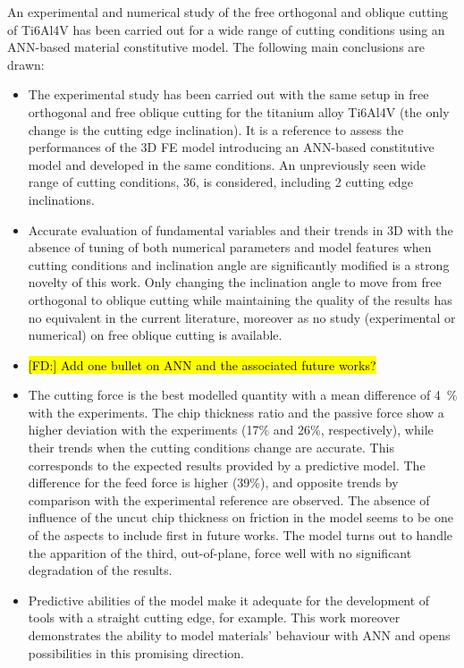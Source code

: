 \documentclass[preprint,12pt,times]{elsarticle}
\DeclareRobustCommand{\FD}[1]{ {\begingroup\sethlcolor{VWgreen}\textcolor{black}{\hl{[FD:] #1}}\endgroup} }
\begin{document}
An experimental and numerical study of the free orthogonal and oblique cutting of Ti6Al4V has been carried out for a wide range of cutting conditions using an ANN-based material constitutive model. The following main conclusions are drawn:
\begin{itemize}
  \item The experimental study has been carried out with the same setup in free orthogonal and free oblique cutting for the titanium alloy Ti6Al4V (the only change is the cutting edge inclination). It is a reference to assess the performances of the 3D FE model introducing an ANN-based constitutive model and developed in the same conditions. An unpreviously seen wide range of cutting conditions, 36, is considered, including 2 cutting edge inclinations.
  \item Accurate evaluation of fundamental variables and their trends in 3D with the absence of tuning of both numerical parameters and model features when cutting conditions and inclination angle are significantly modified is a strong novelty of this work. Only changing the inclination angle to move from free orthogonal to oblique cutting while maintaining the quality of the results has no equivalent in the current literature, moreover as no study (experimental or numerical) on free oblique cutting is available.
  \item \FD{Add one bullet on ANN and the associated future works?}
  \item The cutting force is the best modelled quantity with a mean difference of \qty{4}{\%} with the experiments. The chip thickness ratio and the passive force show a higher deviation with the experiments (17\% and 26\%, respectively), while their trends when the cutting conditions change are accurate. This corresponds to the expected results provided by a predictive model. The difference for the feed force is higher (39\%), and opposite trends by comparison with the experimental reference are observed. The absence of influence of the uncut chip thickness on friction in the model seems to be one of the aspects to include first in future works. The model turns out to handle the apparition of the third, out-of-plane, force well with no significant degradation of the results.
  \item Predictive abilities of the model make it adequate for the development of tools with a straight cutting edge, for example. This work moreover demonstrates the ability to model materials' behaviour with ANN and opens possibilities in this promising direction.
\end{itemize}
\end{document}
